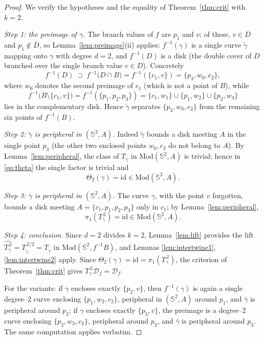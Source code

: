 \documentclass[11pt]{amsart}
\theoremstyle{plain}
\theoremstyle{definition}
\newcommand{\Sph}{\mathbb{S}^2}
\newcommand{\Mod}{\mathrm{Mod}}
\newcommand{\D}{\mathcal{D}}
\newcommand{\id}{\mathrm{id}}
\begin{document}
\begin{proof}
We verify the hypotheses and the equality of
Theorem~\ref{thm:crit} with $k=2$.

\emph{Step 1: the preimage of $\gamma$.}  The branch values of $f$ are
$p_1$ and $v$; of these, $v\in D$ and $p_1\notin\overline D$, so
Lemma~\ref{lem:preimage}(ii) applies: $f^{-1}(\gamma)$ is a single curve
$\tilde\gamma$ mapping onto $\gamma$ with degree $d=2$, and
$f^{-1}(D)$ is a disk (the double cover of $D$ branched over the single
branch value $v\in D$).  Concretely
$$f^{-1}(D)\ \supset\ f^{-1}\bigl(D\cap B\bigr)
=f^{-1}(\{c_1,v\})=\{p_3,w_0,c_2\},$$
where $w_0$ denotes the second preimage of $c_1$ (which is not a point of
$B$), while
$$f^{-1}\bigl(B\setminus\{c_1,v\}\bigr)
=f^{-1}(\{p_1,p_2,p_3\})
=\{c_1,w_1\}\cup\{p_1,w_2\}\cup\{p_2,w_3\}$$
lies in the complementary disk.  Hence $\tilde\gamma$ separates
$\{p_3,w_0,c_2\}$ from the remaining six points of $f^{-1}(B)$.

\emph{Step 2: $\tilde\gamma$ is peripheral in $(\Sph,A)$.}  Indeed
$\tilde\gamma$ bounds a disk meeting $A$ in the single point $p_3$
(the other two enclosed points $w_0,c_2$ do not belong to $A$).  By
Lemma~\ref{lem:peripheral}, the class of $T_{\tilde\gamma}$ in
$\Mod(\Sph,A)$ is trivial; hence in \eqref{eq:theta} the single factor is
trivial and
$$\Theta_2(\gamma)=\id\in\Mod(\Sph,A).$$

\emph{Step 3: $\bar\gamma$ is peripheral in $(\Sph,A)$.}  The curve
$\gamma$, with the point $v$ forgotten, bounds a disk meeting
$A=\{c_1,p_1,p_2,p_3\}$ only in $c_1$; by
Lemma~\ref{lem:peripheral},
$$\pi_1(T_\gamma^{\,2})=\id\in\Mod(\Sph,A).$$

\emph{Step 4: conclusion.}  Since $d=2$ divides $k=2$,
Lemma~\ref{lem:lift} provides the lift
$\widehat{T_\gamma^{\,2}}=T_{\tilde\gamma}^{\,2/2}=T_{\tilde\gamma}$ in
$\Mod(\Sph,f^{-1}B)$, and
Lemmas \ref{lem:intertwine1}, \ref{lem:intertwine2} apply.  Since
$\Theta_2(\gamma)=\id=\pi_1(T_\gamma^{\,2})$, the criterion of
Theorem~\ref{thm:crit} gives $T_\gamma^{\,2}\D_f=\D_f$.

For the variants: if $\gamma$ encloses exactly $\{p_2,v\}$, then
$f^{-1}(\gamma)$ is again a single degree--$2$ curve enclosing
$\{p_1,w_2,c_2\}$, peripheral in $(\Sph,A)$ around $p_1$, and
$\bar\gamma$ is peripheral around $p_2$; if $\gamma$ encloses exactly
$\{p_3,v\}$, the preimage is a degree--$2$ curve enclosing
$\{p_2,w_3,c_2\}$, peripheral around $p_2$, and $\bar\gamma$ is peripheral
around $p_3$.  The same computation applies verbatim.
\end{proof}
\end{document}
